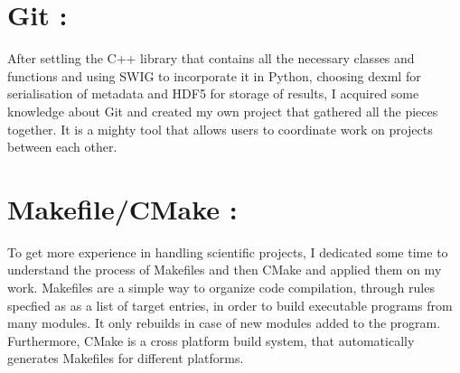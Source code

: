 \section{Git :}
After settling the C++ library that contains all the necessary classes and functions and using SWIG to incorporate it in Python, choosing dexml for serialisation of metadata and HDF5 for storage of results, I acquired some knowledge about Git and created my own project that gathered all the pieces together. It is a mighty tool that allows users to coordinate work on projects between each other.\\\section{Makefile/CMake :}
To get more experience in handling scientific projects, I dedicated some time to understand the process of Makefiles and then CMake and applied them on my work. Makefiles are a simple way to organize code compilation, through rules specfied as as a list of target entries, in order to build executable programs from many modules. It only rebuilds in case of new modules added to the program. Furthermore, CMake is a cross platform build system, that automatically generates Makefiles for different platforms.

